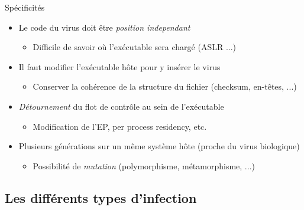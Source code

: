 \documentclass{beamer}
\begin{document}
\begin{frame}{Spécificités}

\begin{itemize}
\item Le code du virus doit être \textit{position independant}
\begin{itemize}
\item Difficile de savoir où l'exécutable sera chargé (ASLR ...)
\end{itemize}
\item Il faut modifier l'exécutable hôte pour y insérer le virus
\begin{itemize}
\item Conserver la cohérence de la structure du fichier (checksum, en-têtes, ...)
\end{itemize}
\item \textit{Détournement} du flot de contrôle au sein de l'exécutable
\begin{itemize}
\item Modification de l'EP, per process residency, etc.
\end{itemize}
\item Plusieurs générations sur un même système hôte (proche du virus biologique)
\begin{itemize}
\item Possibilité de \textit{mutation} (polymorphisme, métamorphisme, ...)
\end{itemize}
\end{itemize}
\end{frame}

\subsection{Les différents types d'infection}
\end{document}
